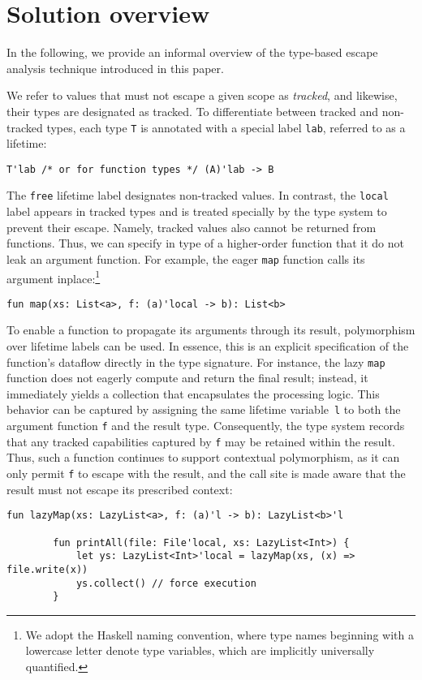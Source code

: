 \documentclass[11pt]{article}
\begin{document}
    \section{Solution overview}

    In the following, we provide an informal overview of the type-based escape analysis technique introduced in this paper.

    We refer to values that must not escape a given scope as \textit{tracked}, and likewise, their types are designated as tracked.
    To differentiate between tracked and non-tracked types, each type \lstinline[language=colang]|T| is annotated with a special label \lstinline[language=colang]|lab|, referred to as a lifetime:
    \begin{lstlisting}[language=colang]
        T'lab /* or for function types */ (A)'lab -> B
    \end{lstlisting}

    The \lstinline[language=colang]|free| lifetime label designates non-tracked values.
    In contrast, the \lstinline[language=colang]|local| label appears in tracked types and is treated specially by the type system to prevent their escape.
    Namely, tracked values also cannot be returned from functions.
    Thus, we can specify in type of a higher-order function that it do not leak an argument function.
    For example, the eager \lstinline[language=colang]|map| function calls its argument inplace:\footnote{We adopt the Haskell naming convention, where type names beginning with a lowercase letter denote type variables, which are implicitly universally quantified.}
    \begin{lstlisting}[language=colang]
        fun map(xs: List<a>, f: (a)'local -> b): List<b>
    \end{lstlisting}

    To enable a function to propagate its arguments through its result, polymorphism over lifetime labels can be used.
    In essence, this is an explicit specification of the function’s dataflow directly in the type signature.
    For instance, the lazy \lstinline[language=colang]|map| function does not eagerly compute and return the final result; instead, it immediately yields a collection that encapsulates the processing logic.
    This behavior can be captured by assigning the same lifetime variable~\lstinline[language=colang]|l| to both the argument function \lstinline[language=colang]|f| and the result type.
    Consequently, the type system records that any tracked capabilities captured by \lstinline[language=colang]|f| may be retained within the result.
    Thus, such a function continues to support contextual polymorphism, as it can only permit \texttt{f} to escape with the result, and the call site is made aware that the result must not escape its prescribed context:
    \begin{lstlisting}[language=colang]
        fun lazyMap(xs: LazyList<a>, f: (a)'l -> b): LazyList<b>'l

        fun printAll(file: File'local, xs: LazyList<Int>) {
            let ys: LazyList<Int>'local = lazyMap(xs, (x) => file.write(x))
            ys.collect() // force execution
        }
    \end{lstlisting}
\end{document}
